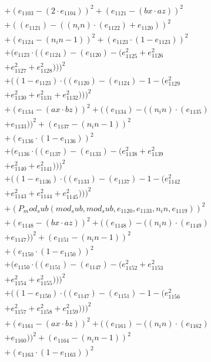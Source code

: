 \documentclass[10pt, a4paper]{article}
\begin{document}
\begin{align*}
& + (e_{1103} - (2  \cdot  e_{1104}))^{2} + (e_{1121} - (bx  \cdot  az))^{2} \\
& + ((e_{1121}) - ((n_in)  \cdot  (e_{1122}) + e_{1120}))^{2} \\
& + (e_{1124} - (n_in - 1))^{2} + (e_{1123}  \cdot  (1 - e_{1123}))^{2} \\
& + (e_{1123}  \cdot  ((e_{1124}) - (e_{1120}) - (e_{1125}^{2} + e_{1126}^{2} \\
& + e_{1127}^{2} + e_{1128}^{2})))^{2} \\
& + ((1 - e_{1123})  \cdot  ((e_{1120}) - (e_{1124}) - 1 - (e_{1129}^{2} \\
& + e_{1130}^{2} + e_{1131}^{2} + e_{1132}^{2})))^{2} \\
& + (e_{1134} - (ax  \cdot  bz))^{2} + ((e_{1134}) - ((n_in)  \cdot  (e_{1135}) \\
& + e_{1133}))^{2} + (e_{1137} - (n_in - 1))^{2} \\
& + (e_{1136}  \cdot  (1 - e_{1136}))^{2} \\
& + (e_{1136}  \cdot  ((e_{1137}) - (e_{1133}) - (e_{1138}^{2} + e_{1139}^{2} \\
& + e_{1140}^{2} + e_{1141}^{2})))^{2} \\
& + ((1 - e_{1136})  \cdot  ((e_{1133}) - (e_{1137}) - 1 - (e_{1142}^{2} \\
& + e_{1143}^{2} + e_{1144}^{2} + e_{1145}^{2})))^{2} \\
& + (P_mod_sub(mod_sub, mod_sub, e_{1120}, e_{1133}, n_in, e_{1119}))^{2} \\
& + (e_{1148} - (bx  \cdot  az))^{2} + ((e_{1148}) - ((n_in)  \cdot  (e_{1149}) \\
& + e_{1147}))^{2} + (e_{1151} - (n_in - 1))^{2} \\
& + (e_{1150}  \cdot  (1 - e_{1150}))^{2} \\
& + (e_{1150}  \cdot  ((e_{1151}) - (e_{1147}) - (e_{1152}^{2} + e_{1153}^{2} \\
& + e_{1154}^{2} + e_{1155}^{2})))^{2} \\
& + ((1 - e_{1150})  \cdot  ((e_{1147}) - (e_{1151}) - 1 - (e_{1156}^{2} \\
& + e_{1157}^{2} + e_{1158}^{2} + e_{1159}^{2})))^{2} \\
& + (e_{1161} - (ax  \cdot  bz))^{2} + ((e_{1161}) - ((n_in)  \cdot  (e_{1162}) \\
& + e_{1160}))^{2} + (e_{1164} - (n_in - 1))^{2} \\
& + (e_{1163}  \cdot  (1 - e_{1163}))^{2} \\

\end{align*}
\end{document}
